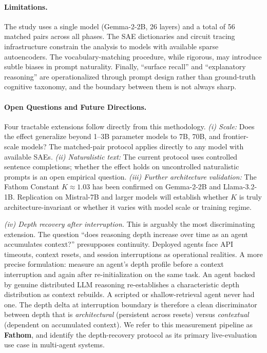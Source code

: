\documentclass[10pt]{article}
\begin{document}
\paragraph{Limitations.}
The study uses a single model (Gemma-2-2B, 26 layers) and a total of 56 matched pairs across all phases. The SAE dictionaries and circuit tracing infrastructure constrain the analysis to models with available sparse autoencoders. The vocabulary-matching procedure, while rigorous, may introduce subtle biases in prompt naturality. Finally, ``surface recall'' and ``explanatory reasoning'' are operationalized through prompt design rather than ground-truth cognitive taxonomy, and the boundary between them is not always sharp.

\paragraph{Open Questions and Future Directions.}
Four tractable extensions follow directly from this methodology. \emph{(i) Scale:} Does the effect generalize beyond 1--3B parameter models to 7B, 70B, and frontier-scale models? The matched-pair protocol applies directly to any model with available SAEs. \emph{(ii) Naturalistic text:} The current protocol uses controlled sentence completions; whether the effect holds on uncontrolled naturalistic prompts is an open empirical question. \emph{(iii) Further architecture validation:} The Fathom Constant $K \approx 1.03$ has been confirmed on Gemma-2-2B and Llama-3.2-1B. Replication on Mistral-7B and larger models will establish whether $K$ is truly architecture-invariant or whether it varies with model scale or training regime.

\emph{(iv) Depth recovery after interruption.} This is arguably the most discriminating extension. The question ``does reasoning depth increase over time as an agent accumulates context?'' presupposes continuity. Deployed agents face API timeouts, context resets, and session interruptions as operational realities. A more precise formulation: measure an agent's depth profile before a context interruption and again after re-initialization on the same task. An agent backed by genuine distributed LLM reasoning re-establishes a characteristic depth distribution as context rebuilds. A scripted or shallow-retrieval agent never had one. The depth delta at interruption boundary is therefore a clean discriminator between depth that is \emph{architectural} (persistent across resets) versus \emph{contextual} (dependent on accumulated context). We refer to this measurement pipeline as \textbf{Fathom}, and identify the depth-recovery protocol as its primary live-evaluation use case in multi-agent systems.
\end{document}
